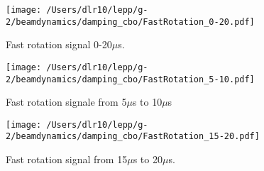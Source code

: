 \documentclass[10pt]{report}
\begin{document}
\begin{figure}[htbp] %
   \centering
   \texttt{[image: /Users/dlr10/lepp/g-2/beamdynamics/damping\_cbo/FastRotation\_0-20.pdf]} 
   \caption{Fast rotation signal 0-20$\mu$s. \label{fig:fastrotation_0-20}}
\end{figure}
\begin{figure}[htbp] %
\begin{minipage}[t]{0.48\textwidth}
   \centering
   \texttt{[image: /Users/dlr10/lepp/g-2/beamdynamics/damping\_cbo/FastRotation\_5-10.pdf]} 
   \caption{Fast rotation signale from 5$\mu$s to 10$\mu$s \label{fig:fastrotation_5-10}}
 \end{minipage}
\hfill
\begin{minipage}[t]{0.48\textwidth}
\centering
   \texttt{[image: /Users/dlr10/lepp/g-2/beamdynamics/damping\_cbo/FastRotation\_15-20.pdf]} 
\caption{Fast rotation signal from 15$\mu$s to 20$\mu$s.
   \label{fig:fastrotation_15-20}}
\end{minipage}
\end{figure}
\end{document}
